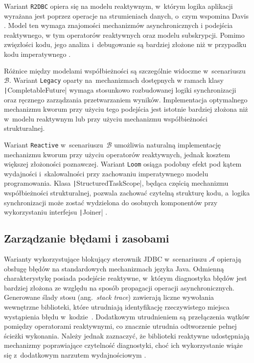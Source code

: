 Wariant \texttt{R2DBC} opiera się na modelu reaktywnym, w~którym logika aplikacji wyrażana jest poprzez operacje na strumieniach danych, o~czym wspomina Davis \cite{davis2019}. Model ten wymaga znajomości mechanizmów asynchronicznych i podejścia reaktywnego, w tym operatorów reaktywnych oraz modelu subskrypcji. Pomimo zwięzłości kodu, jego analiza i~debugowanie są bardziej złożone niż w przypadku kodu imperatywnego \cite{shahoor2024,ponnampalam2025}.

Różnice między modelami współbieżności są szczególnie widoczne w~scenariuszu~$\mathcal{B}$. Wariant \texttt{Legacy} oparty na~mechanizmach dostępnych w ramach klasy \texttt|CompletableFuture| wymaga stosunkowo rozbudowanej logiki synchronizacji oraz ręcznego zarządzania przetwarzaniem wyników. Implementacja optymalnego mechanizmu kworum przy użyciu tego podejścia jest istotnie bardziej złożona niż w~modelu reaktywnym lub przy użyciu mechanizmu współbieżności strukturalnej.

Wariant \texttt{Reactive} w~scenariuszu~$\mathcal{B}$ umożliwia naturalną implementację mechanizmu kworum przy użyciu operatorów reaktywnych, jednak kosztem większej złożoności poznawczej. Wariant \texttt{Loom} osiąga podobny efekt pod kątem wydajności i~skalowalności przy zachowaniu imperatywnego modelu programowania. Klasa \texttt|StructuredTaskScope|, będąca częścią mechanizmu współbieżności strukturalnej, pozwala zachować czytelną strukturę kodu, a~logika synchronizacji może zostać wydzielona do osobnych komponentów przy wykorzystaniu interfejsu \texttt|Joiner| \cite{jep525,java-structured-task-scope,java-structured-task-scope-joiner}.

\subsection{Zarządzanie błędami i zasobami}
\label{sec:quant-analysis-error-handling}

Warianty wykorzystujące blokujący sterownik JDBC w~scenariuszu $\mathcal{A}$ opierają obsługę błędów na standardowych mechanizmach języka Java. Odmienną charakterystykę posiada podejście reaktywne, w~którym diagnostyka błędów jest bardziej złożona ze względu na sposób propagacji operacji asynchronicznych. Generowane ślady stosu (ang.~\emph{stack trace}) zawierają liczne wywołania wewnętrzne biblioteki, które utrudniają identyfikację rzeczywistego miejsca wystąpienia błędu w~kodzie~\cite{shahoor2024}. Dodatkowym utrudnieniem są przełączenia wątków pomiędzy operatorami reaktywnymi, co znacznie utrudnia odtworzenie pełnej ścieżki wykonania. Należy jednak zaznaczyć, że biblioteki reaktywne udostępniają mechanizmy poprawiające czytelność diagnostyki, choć ich wykorzystanie wiąże się z~dodatkowym narzutem wydajnościowym \cite{davis2019,reactor-docs}.

